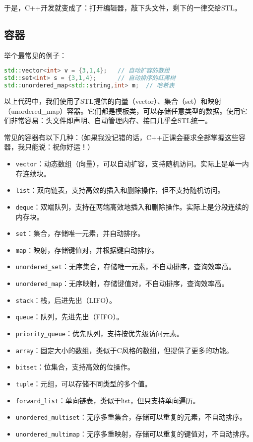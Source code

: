 \documentclass[../main.tex]{subfiles}
\begin{document}
于是，C++开发就变成了：打开编辑器，敲下头文件，剩下的一律交给STL。

\subsection{容器}

举个最常见的例子：
\begin{lstlisting}[language=C++]
std::vector<int> v = {3,1,4};   // 自动扩容的数组
std::set<int> s = {3,1,4};      // 自动排序的红黑树
std::unordered_map<std::string,int> m;  // 哈希表
\end{lstlisting}
以上代码中，我们使用了STL提供的向量（vector）、集合（set）和映射（unordered\_map）容器。它们都是模板类，可以存储任意类型的数据。使用它们非常容易：头文件即声明、自动管理内存、接口几乎全STL统一。

常见的容器有以下几种：（如果我没记错的话，C++正课会要求全部掌握这些容器，我只能说：祝你好运！）
\begin{itemize}
  \item \texttt{vector}：动态数组（向量），可以自动扩容，支持随机访问。实际上是单一内存连续块。
  \item \texttt{list}：双向链表，支持高效的插入和删除操作，但不支持随机访问。
  \item \texttt{deque}：双端队列，支持在两端高效地插入和删除操作。实际上是分段连续的内存块。
  \item \texttt{set}：集合，存储唯一元素，并自动排序。
  \item \texttt{map}：映射，存储键值对，并根据键自动排序。
  \item \texttt{unordered\_set}：无序集合，存储唯一元素，不自动排序，查询效率高。
  \item \texttt{unordered\_map}：无序映射，存储键值对，不自动排序，查询效率高。
  \item \texttt{stack}：栈，后进先出（LIFO）。
  \item \texttt{queue}：队列，先进先出（FIFO）。
  \item \texttt{priority\_queue}：优先队列，支持按优先级访问元素。
  \item \texttt{array}：固定大小的数组，类似于C风格的数组，但提供了更多的功能。
  \item \texttt{bitset}：位集合，支持高效的位操作。
  \item \texttt{tuple}：元组，可以存储不同类型的多个值。
  \item \texttt{forward\_list}：单向链表，类似于list，但只支持单向遍历。
  \item \texttt{unordered\_multiset}：无序多重集合，存储可以重复的元素，不自动排序。
  \item \texttt{unordered\_multimap}：无序多重映射，存储可以重复的键值对，不自动排序。
\end{itemize}
\end{document}
